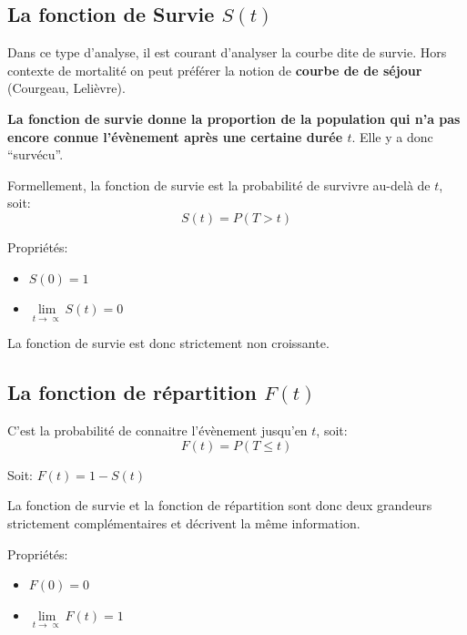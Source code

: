 \documentclass[
  12pt,
  letterpaper,
  DIV=11,
  numbers=noendperiod,
  onepage,
  openany]{scrreprt}
\providecommand{\tightlist}{%
  \setlength{\itemsep}{0pt}\setlength{\parskip}{0pt}}\usepackage{longtable,booktabs,array}
\begin{document}
\hypertarget{la-fonction-de-survie-st}{%
\subsection{\texorpdfstring{La fonction de Survie
\(S(t)\)}{La fonction de Survie S(t)}}\label{la-fonction-de-survie-st}}

Dans ce type d'analyse, il est courant d'analyser la courbe dite de
survie. Hors contexte de mortalité on peut préférer la notion de
\textbf{courbe de de séjour} (Courgeau, Lelièvre).

\textbf{La fonction de survie donne la proportion de la population qui
n'a pas encore connue l'évènement après une certaine durée \(t\)}. Elle
y a donc ``survécu''.

Formellement, la fonction de survie est la probabilité de survivre
au-delà de \(t\), soit:\\

\[S(t) = P(T>t)\]

Propriétés:

\begin{itemize}
\tightlist
\item
  \(S(0)=1\)
\item
  \(\lim\limits_{t\to{\propto}}S(t)=0\)
\end{itemize}

La fonction de survie est donc strictement non croissante.

\hypertarget{la-fonction-de-ruxe9partition-ft}{%
\subsection{\texorpdfstring{La fonction de répartition
\(F(t)\)}{La fonction de répartition F(t)}}\label{la-fonction-de-ruxe9partition-ft}}

C'est la probabilité de connaitre l'évènement jusqu'en \(t\), soit:\\

\[F(t)=P(T\leq{t})\]

Soit: \(F(t) = 1 - S(t)\)

La fonction de survie et la fonction de répartition sont donc deux
grandeurs strictement complémentaires et décrivent la même information.

Propriétés:

\begin{itemize}
\tightlist
\item
  \(F(0)=0\)
\item
  \(\lim\limits_{t\to{\propto}}F(t)=1\)
\end{itemize}
\end{document}
